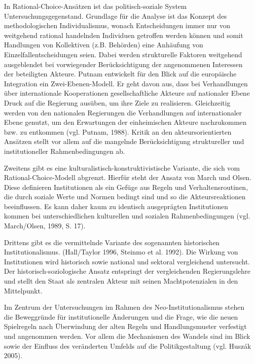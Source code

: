 In Rational-Choice-Ansätzen ist das politisch-soziale System Untersuchungsgegenstand. Grundlage für die Analyse ist das Konzept des methodologischen Individualismus, wonach Entscheidungen immer nur von weitgehend rational handelnden Individuen getroffen werden können und somit Handlungen von Kollektiven (z.B. Behörden) eine Anhäufung von Einzelfallentscheidungen seien. Dabei werden strukturelle Faktoren weitgehend ausgeblendet bei vorwiegender Berücksichtigung der angenommenen Interessen der beteiligten Akteure. Putnam entwickelt für den Blick auf die europäische Integration ein Zwei-Ebenen-Modell. Er geht davon aus, dass bei Verhandlungen über internationale Kooperationen gesellschaftliche Akteure auf nationaler Ebene Druck auf die Regierung ausüben, um ihre Ziele zu realisieren. Gleichzeitig werden von den nationalen Regierungen die Verhandlungen auf internationaler Ebene genutzt, um den Erwartungen der einheimischen Akteure nachzukommen bzw. zu entkommen (vgl. Putnam, 1988). Kritik an den akteursorientierten Ansätzen stellt vor allem auf die mangelnde Berücksichtigung struktureller und institutioneller Rahmenbedingungen ab.\par
Zweitens gibt es eine kulturalistisch-konstruktivistische Variante, die sich vom Rational-Choice-Modell abgrenzt. Hierfür steht der Ansatz von March und Olsen. Diese definieren Institutionen als ein Gefüge aus Regeln und Verhaltensroutinen, die durch soziale Werte und Normen bedingt sind und so die Akteursreaktionen beeinflussen. Es kann daher kaum zu identisch ausgeprägten Institutionen kommen bei unterschiedlichen kulturellen und sozialen Rahmenbedingungen (vgl. March/Olsen, 1989, S. 17).\par
Drittens gibt es die vermittelnde Variante des sogenannten historischen Institutionalismus. (Hall/Taylor 1996, Steinmo et al. 1992). Die Wirkung von Institutionen wird historisch sowie national und sektoral vergleichend untersucht. Der historisch-soziologische Ansatz entspringt der vergleichenden Regierungslehre und stellt den Staat als zentralen Akteur mit seinen Machtpotenzialen in den Mittelpunkt.\par
Im Zentrum der Untersuchungen im Rahmen des Neo-Institutionalismus stehen die Beweggründe für institutionelle Änderungen und die Frage, wie die neuen Spielregeln nach Überwindung der alten Regeln und Handlungsmuster verfestigt und angenommen werden. Vor allem die Mechanismen des Wandels sind im Blick sowie der Einfluss des veränderten Umfelds auf die Politikgestaltung (vgl. Huszák 2005).\par
